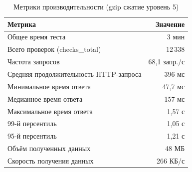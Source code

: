 \documentclass[12pt]{article}
\begin{document}
\begin{table}[h]
    \centering
    \caption{Метрики производительности (gzip сжатие уровень 5)}
    \begin{tabular}{lr}
        \toprule
        \textbf{Метрика}                       & \textbf{Значение} \\
        \midrule
        Общее время теста                      & 3 мин             \\
        \hline
        Всего проверок (checks\_total)         & 12\,338           \\
        Частота запросов                       & 68,1 запр./с      \\
        \hline
        Средняя продолжительность HTTP-запроса & 396 мс            \\
        Минимальное время ответа               & 47,7 мс           \\
        Медианное время ответа                 & 157 мс            \\
        Максимальное время ответа              & 1,57 с            \\
        99-й персентиль                        & 1,05 с            \\
        95-й персентиль                        & 1,21 с            \\
        \hline
        Объём полученных данных                & 48 МБ             \\
        Скорость получения данных              & 266 КБ/с          \\
        \bottomrule
    \end{tabular}
\end{table}
\end{document}
